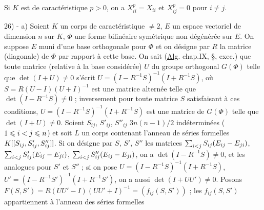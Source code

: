 Si $K$ est de caractéristique $p>0$, on a $X_{ii}^p=X_{ii}$ et $X_{ij}^p=0$ pour $i\ne j$.

\margin{\handwritten{$\unsure{\Pi|\pi}$}}
26) - a) Soient $K$ un corps de caractéristique $\ne2$, $E$ un espace vectoriel de dimension $n$ sur $K$, $\Phi$ une forme bilinéaire symétrique non dégénérée sur $E$. On suppose $E$ muni d'une base orthogonale pour $\Phi$ et on désigne par $R$ la matrice (diagonale) de $\Phi$ par rapport à cette base. On sait (\uline{Alg}. chap.IX, \S\quad, exec.\quad) que toute matrice (relative à la base considérée) $U$ du groupe orthogonal $G(\Phi)$ telle que $\det(I+U)\ne0$ s'écrit $U=(I-R^{-1}S)^{-1}(I+R^{-1}S)$, où $S=R(U-I)(U+I)^{-1}$ est une matrice alternée telle que $\det(I-R^{-1}S)\ne0$ ; inversement pour toute matrice $S$ satisfaisant à ces conditions, $U=(I-R^{-1}S)^{-1}(I+R^{-1}S)$ est une matrice de $G(\Phi)$ telle que $\det(I+U)\ne0$. Soient $S_{ij}$, $S'_{ij}$, $S''_{ij}$ $3n(n-1)/2$ indéterminées ($1\leqslant i<j\leqslant n$) et soit $L$ un corps contenant l'anneau de séries formelles $K[[S_{ij},S'_{ij},S''_{ij}]]$. Si on désigne par $S$, $S'$, $S''$ les matrices $\sum_{i<j}S_{ij}(E_{ij}-E_{ji})$, $\sum_{i<j}S'_{ij}(E_{ij}-E_{ji})$, $\sum_{i<j}S''_{ij}(E_{ij}-E_{ji})$, on a $\det(I-R^{-1}S)\ne0$, et les analogues pour $S'$ et $S''$ ; si on pose $U=(I-R^{-1}S)^{-1}(I+R^{-1}S)$, $U'=(I-R^{-1}S')^{-1}(I+R^{-1}S')$, on a aussi $\det(I+UU')\ne0$. Posons $F(S,S')=R(UU'-I)(UU'+I)^{-1}=(f_{ij}(S,S'))$ ; les $f_{ij}(S,S')$ appartiennent à l'anneau des séries formelles
